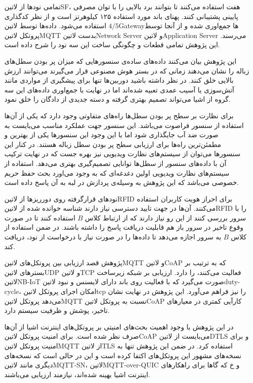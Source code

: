 تمامی نودها از ‌لاتین{SF}، هفت استفاده می‌کنند تا بتوانند برد بالایی را با توان مصرفی پایینی پشتیبانی کنند. پهنای باند مورد استفاده ۱۲۵ کیلوهرتز است و از نظر کدگذاری $4/5$ استفاده می‌شود.
داده‌ها توسط ‌لاتین{Gateway}ها جمع‌اوری شده و از آنجا توسط پروتکل ‌لاتین{MQTT} بدست ‌لاتین{Network Server} و ‌لاتین{Application Server} می‌رسند.
این پژوهش تمامی قطعات و چگونگی ساخت این سه نود را شرح داده است.

این پژوهش بیان می‌کنند داده‌های ساده‌ی سنسورهایی که میزان پر بودن سطل‌های زباله را نشان می‌دهند زمانی که در بستر هوش مصنوعی قرار می‌گیرند می‌توانند ارزش بالایی خلق کنند.
در نظر داشته باشید دوربین‌ها تنها برای پیشگیری از مواردی مانند آتش‌سوزی یا آسیب عمدی تعبیه شده‌اند اما در نهایت با جمع‌اوری داده‌های این سه گروه از اشیا می‌تواند تصمیم بهتری گرفته و دسته جدیدی از دادگان را خلق نمود.

برای نظارت بر سطح پر بودن سطل‌ها راه‌های متفاوتی وجود دارد که یکی از آن‌ها استفاده از سنسور فراصوت می‌باشد. این سنسور جهت عملکرد مناسب می‌بایست به صورت ضد آب جایگذاری شود اما با این وجود
این سنسورها یکی از بهترین و مطمئن‌ترین راه‌ها برای ارزیابی سطح پر بودن سطل زباله هستند. در کنار این سنسورها می‌توان از سیستم‌های نظارت ویدیویی نیز بهره جست که در نهایت ترکیب آن با داده‌های سنسور
از سطل‌ها توانایی تصمیم‌گیری بهتری می‌دهد. استفاده از سیستم‌های نظارت ویدیویی اولین دغدغه‌ای که به وجود می‌اورد بحث حفظ حریم خصوصی می‌باشد که این پژوهش به وسیله‌ی پردازش در لبه به آن پاسخ داده است.

نودهای قرارگرفته روی دورریزها از ‌لاتین{RFID} برای احراز هویت کاربران استفاده می‌کنند. آن‌ها در جهت تایید دسترسی نیاز دارند شناسه خوانده شده از ‌لاتین{RFID} را با سرور بررسی کنند
از این رو نیاز دارند که از ارتباط کلاس $B$ استفاده کنند تا در صورت وقوع تاخیر در سرور باز هم قابلیت دریافت پاسخ را داشته باشند. در ضمن استفاده از کلاس $B$ به سرور اجازه می‌دهد تا داده‌ها را
در صورت نیاز با درخواست از نود، دریافت کند.


پژوهش  قصد ارزیابی بین پروتکل‌های ‌لاتین{MQTT} و ‌لاتین{CoAP} که به ترتیب بر بسترهای ‌لاتین{UDP} و ‌لاتین{TCP} فعالیت می‌کنند، را دارد.
ارزیابی بر شبکه زیرساخت ‌لاتین{NB-IoT} صورت می‌گیرد که با فعالیت روی باند دارای لایسنس و نبود ‌لاتین{duty-cycle}، امکان اجرای پروتکل ‌لاتین{tcp} را نیز فراهم می‌آورد.
این پژوهش در نهایت نشان می‌دهد پروتکل ‌لاتین{MQTT} نسبت به پروتکل ‌لاتین{CoAP} کارآیی کمتری در معیارهای تاخیر، پوشش و ظرفیت سیستم دارد.

در این پژوهش با وجود اهمیت بحث‌های امنیتی بر پروتکل‌های اینترنت اشیا از آن‌ها صرف نظر شده است. برای امنیت پروتکل ‌لاتین{CoAP} می‌بایست از ‌لاتین{DTLS} و
برای امنیت پروتکل ‌لاتین{MQTT} از ‌لاتین{TLS} استفاده کرد.
در ضمن این پژوهش تنها به نسخه‌های مشهور این پروتکل‌های اکتفا کرده است و این در حالی است که نسخه‌های دیگری مانند ‌لاتین{MQTT-SN}، ‌لاتین{MQTT-over-QUIC} و ‌خ
که گاها برای راهکارهای اینترنت اشیا بهینه شده‌اند، نیازمند ارزیابی می‌باشند.

